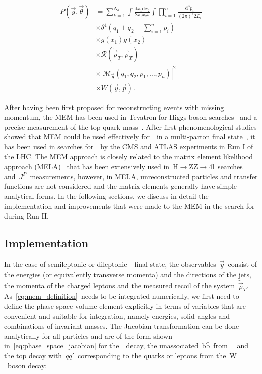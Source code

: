 \begin{align}
\label{eq:mem_definition}
P(\vec{y}, \vec{\theta}) &= \sum_{k=1}^{N_a} \int \frac{\mathrm{d}x_1 \mathrm{d}x_2}{2 x_1 x_2 s} \int \prod_{i=1}^{n} \frac{\mathrm{d}^3 p_i}{(2\pi)^3 2 E_i} \\
&\times \delta^4 (q_1 + q_2 - \sum_{i=1}^n p_i)\\
&\times g(x_1) g(x_2) \\ 
&\times \mathcal{R}(\tilde{\vec{\rho}}_T, \vec{\rho}_T) \\ 
&\times |\mathcal{M}_{\vec{\theta}}(q_1, q_2, p_1, \dots, p_n)|^2 \\
&\times W(\vec{y}, \vec{p}).
\end{align}

After having been first proposed for reconstructing events with missing momentum\cite{Kondo:1988yd}, the MEM has been used in Tevatron for Higgs boson searches~\cite{Aaltonen:2009dh,Aaltonen:2011rt} and a precise measurement of the top quark mass~\cite{D0topmass2004}. After first phenomenological studies showed that MEM could be used effectively for~\ttH~in a multi-parton final state~\cite{Artoisenet:2013vfa}, it has been used in searches for~\ttHbb~by the CMS and ATLAS experiments in Run I of the LHC\cite{Aad:2015gra,Khachatryan:2015ila}. The MEM approach is closely related to the matrix element likelihood approach (MELA)~\cite{Gao:2010qx} that has been extensively used in~$\mathrm{H} \rightarrow \mathrm{ZZ} \rightarrow 4\mathrm{l}$~searches and~$J^P$~measurements, however, in MELA, unreconstructed particles and transfer functions are not considered and the matrix elements generally have simple analytical forms.
In the following sections, we discuss in detail the implementation and improvements that were made to the MEM in the search for \ttHbb during Run II.

\subsection{Implementation}
\label{sec:mem_implementation}
In the case of semileptonic or dileptonic~\ttH~final state, the observables~$\vec{y}$~consist of the energies (or equivalently transverse momenta) and the directions of the jets, the momenta of the charged leptons and the measured recoil of the system~$\tilde{\vec{\rho}}_T$. As~\cref{eq:mem_definition}~needs to be integrated numerically, we first need to define the phase space volume element explicitly in terms of variables that are convenient and suitable for integration, namely energies, solid angles and combinations of invariant masses. The Jacobian transformation can be done analytically for all particles and are of the form shown in~\cref{eq:phase_space_jacobian} for the~\Hbb~decay, the unassociated~$\mathrm{b}\bar{\mathrm{b}}$~from~\ttbb~ and the top decay with~$qq'$~corresponding to the quarks or leptons from the~$\mathrm{W}$~boson decay:

